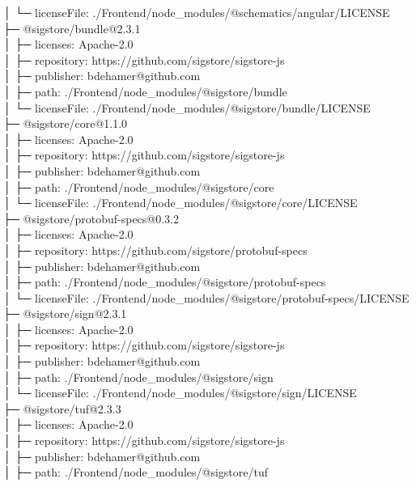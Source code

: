 │  └─ licenseFile: ./Frontend/node\_modules/@schematics/angular/LICENSE\\
├─ @sigstore/bundle@2.3.1\\
│  ├─ licenses: Apache-2.0\\
│  ├─ repository: https://github.com/sigstore/sigstore-js\\
│  ├─ publisher: bdehamer@github.com\\
│  ├─ path: ./Frontend/node\_modules/@sigstore/bundle\\
│  └─ licenseFile: ./Frontend/node\_modules/@sigstore/bundle/LICENSE\\
├─ @sigstore/core@1.1.0\\
│  ├─ licenses: Apache-2.0\\
│  ├─ repository: https://github.com/sigstore/sigstore-js\\
│  ├─ publisher: bdehamer@github.com\\
│  ├─ path: ./Frontend/node\_modules/@sigstore/core\\
│  └─ licenseFile: ./Frontend/node\_modules/@sigstore/core/LICENSE\\
├─ @sigstore/protobuf-specs@0.3.2\\
│  ├─ licenses: Apache-2.0\\
│  ├─ repository: https://github.com/sigstore/protobuf-specs\\
│  ├─ publisher: bdehamer@github.com\\
│  ├─ path: ./Frontend/node\_modules/@sigstore/protobuf-specs\\
│  └─ licenseFile: ./Frontend/node\_modules/@sigstore/protobuf-specs/LICENSE\\
├─ @sigstore/sign@2.3.1\\
│  ├─ licenses: Apache-2.0\\
│  ├─ repository: https://github.com/sigstore/sigstore-js\\
│  ├─ publisher: bdehamer@github.com\\
│  ├─ path: ./Frontend/node\_modules/@sigstore/sign\\
│  └─ licenseFile: ./Frontend/node\_modules/@sigstore/sign/LICENSE\\
├─ @sigstore/tuf@2.3.3\\
│  ├─ licenses: Apache-2.0\\
│  ├─ repository: https://github.com/sigstore/sigstore-js\\
│  ├─ publisher: bdehamer@github.com\\
│  ├─ path: ./Frontend/node\_modules/@sigstore/tuf\\
